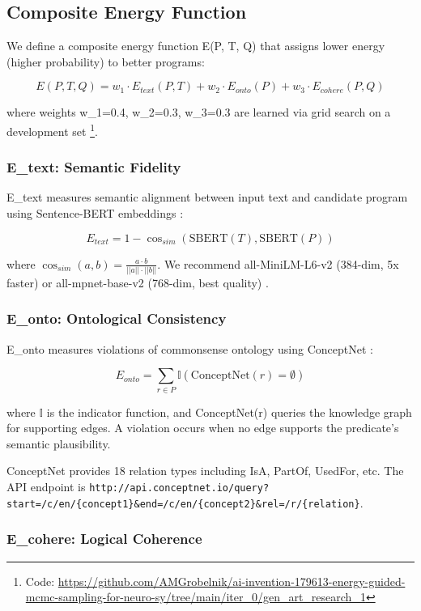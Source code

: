 \documentclass[11pt,letterpaper]{article}
\begin{document}
\subsection{Composite Energy Function}

We define a composite energy function E(P, T, Q) that assigns lower energy (higher probability) to better programs:

$$E(P, T, Q) = w_1 \cdot E_{text}(P, T) + w_2 \cdot E_{onto}(P) + w_3 \cdot E_{cohere}(P, Q)$$

where weights w\_1=0.4, w\_2=0.3, w\_3=0.3 are learned via grid search on a development set \footnote{Code: \url{https://github.com/AMGrobelnik/ai-invention-179613-energy-guided-mcmc-sampling-for-neuro-sy/tree/main/iter_0/gen_art_research_1}}.

\subsubsection{E\_text: Semantic Fidelity}

E\_text measures semantic alignment between input text and candidate program using Sentence-BERT embeddings \cite{Reimers2019}:

$$E_{text} = 1 - \cos_{sim}(\text{SBERT}(T), \text{SBERT}(P))$$

where $\cos_{sim}(a, b) = \frac{a \cdot b}{||a|| \cdot ||b||}$. We recommend all-MiniLM-L6-v2 (384-dim, 5x faster) or all-mpnet-base-v2 (768-dim, best quality) \cite{Reimers2019docs}.

\subsubsection{E\_onto: Ontological Consistency}

E\_onto measures violations of commonsense ontology using ConceptNet \cite{Speer2017}:

$$E_{onto} = \sum_{r \in P} \mathbb{I}(\text{ConceptNet}(r) = \emptyset)$$

where $\mathbb{I}$ is the indicator function, and ConceptNet(r) queries the knowledge graph for supporting edges. A violation occurs when no edge supports the predicate's semantic plausibility.

ConceptNet provides 18 relation types including IsA, PartOf, UsedFor, etc. The API endpoint is \texttt{http://api.conceptnet.io/query?start=/c/en/\{concept1\}\&end=/c/en/\{concept2\}\&rel=/r/\{relation\}}.

\subsubsection{E\_cohere: Logical Coherence}
\end{document}
